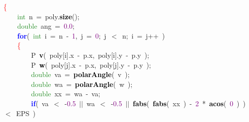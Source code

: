 {{\mbox{}\textcolor{Red}{\{} \\
\mbox{}\ \ \ \ \textcolor{ForestGreen}{int}\ n\ \textcolor{BrickRed}{=}\ poly\textcolor{BrickRed}{.}\textbf{\textcolor{Black}{size}}\textcolor{BrickRed}{();} \\
\mbox{}\ \ \ \ \textcolor{ForestGreen}{double}\ ang\ \textcolor{BrickRed}{=}\ \textcolor{Purple}{0.0}\textcolor{BrickRed}{;} \\
\mbox{}\ \ \ \ \textbf{\textcolor{Blue}{for}}\textcolor{BrickRed}{(}\ \textcolor{ForestGreen}{int}\ i\ \textcolor{BrickRed}{=}\ n\ \textcolor{BrickRed}{-}\ \textcolor{Purple}{1}\textcolor{BrickRed}{,}\ j\ \textcolor{BrickRed}{=}\ \textcolor{Purple}{0}\textcolor{BrickRed}{;}\ j\ \textcolor{BrickRed}{$<$}\ n\textcolor{BrickRed}{;}\ i\ \textcolor{BrickRed}{=}\ j\textcolor{BrickRed}{++}\ \textcolor{BrickRed}{)} \\
\mbox{}\ \ \ \ \textcolor{Red}{\{} \\
\mbox{}\ \ \ \ \ \ \ \ P\ \textbf{\textcolor{Black}{v}}\textcolor{BrickRed}{(}\ poly\textcolor{BrickRed}{[}i\textcolor{BrickRed}{].}x\ \textcolor{BrickRed}{-}\ p\textcolor{BrickRed}{.}x\textcolor{BrickRed}{,}\ poly\textcolor{BrickRed}{[}i\textcolor{BrickRed}{].}y\ \textcolor{BrickRed}{-}\ p\textcolor{BrickRed}{.}y\ \textcolor{BrickRed}{);} \\
\mbox{}\ \ \ \ \ \ \ \ P\ \textbf{\textcolor{Black}{w}}\textcolor{BrickRed}{(}\ poly\textcolor{BrickRed}{[}j\textcolor{BrickRed}{].}x\ \textcolor{BrickRed}{-}\ p\textcolor{BrickRed}{.}x\textcolor{BrickRed}{,}\ poly\textcolor{BrickRed}{[}j\textcolor{BrickRed}{].}y\ \textcolor{BrickRed}{-}\ p\textcolor{BrickRed}{.}y\ \textcolor{BrickRed}{);} \\
\mbox{}\ \ \ \ \ \ \ \ \textcolor{ForestGreen}{double}\ va\ \textcolor{BrickRed}{=}\ \textbf{\textcolor{Black}{polarAngle}}\textcolor{BrickRed}{(}\ v\ \textcolor{BrickRed}{);} \\
\mbox{}\ \ \ \ \ \ \ \ \textcolor{ForestGreen}{double}\ wa\ \textcolor{BrickRed}{=}\ \textbf{\textcolor{Black}{polarAngle}}\textcolor{BrickRed}{(}\ w\ \textcolor{BrickRed}{);} \\
\mbox{}\ \ \ \ \ \ \ \ \textcolor{ForestGreen}{double}\ xx\ \textcolor{BrickRed}{=}\ wa\ \textcolor{BrickRed}{-}\ va\textcolor{BrickRed}{;} \\
\mbox{}\ \ \ \ \ \ \ \ \textbf{\textcolor{Blue}{if}}\textcolor{BrickRed}{(}\ va\ \textcolor{BrickRed}{$<$}\ \textcolor{BrickRed}{-}\textcolor{Purple}{0.5}\ \textcolor{BrickRed}{$|$$|$}\ wa\ \textcolor{BrickRed}{$<$}\ \textcolor{BrickRed}{-}\textcolor{Purple}{0.5}\ \textcolor{BrickRed}{$|$$|$}\ \textbf{\textcolor{Black}{fabs}}\textcolor{BrickRed}{(}\ \textbf{\textcolor{Black}{fabs}}\textcolor{BrickRed}{(}\ xx\ \textcolor{BrickRed}{)}\ \textcolor{BrickRed}{-}\ \textcolor{Purple}{2}\ \textcolor{BrickRed}{*}\ \textbf{\textcolor{Black}{acos}}\textcolor{BrickRed}{(}\ \textcolor{Purple}{0}\ \textcolor{BrickRed}{)}\ \textcolor{BrickRed}{)}\ \textcolor{BrickRed}{$<$}\ EPS\ \textcolor{BrickRed}{)} \\
}}

